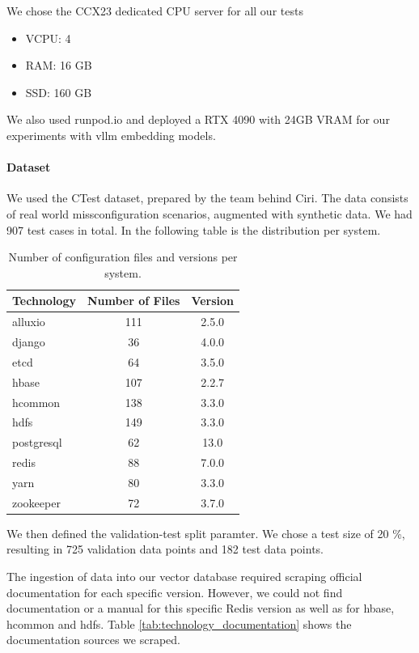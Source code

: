 We chose the CCX23 dedicated CPU server\cite{hetzner-online-gmbh-2025} for all our tests
\begin{itemize}
    \item VCPU: 4
    \item RAM: 16 GB
    \item SSD: 160 GB
\end{itemize}

We also used runpod.io\cite{runpod-2025} and deployed a RTX 4090 with 24GB VRAM for our experiments with vllm \cite{Kwon.12.09.2023} embedding models.

\paragraph{Dataset} 
We used the CTest dataset, prepared by the team behind Ciri\cite{Lian.2024}\cite{xlab-uiuc-2025}. The data consists of real world missconfiguration scenarios, augmented with synthetic data. We had 907 test cases in total. In the following table is the distribution per system.

\begin{table}[h]
    \centering
    \begin{tabular}{|l|c|c|}
        \hline
        \textbf{Technology} & \textbf{Number of Files} & \textbf{Version} \\
        \hline
        alluxio & 111 & 2.5.0 \\
        django & 36 & 4.0.0 \\
        etcd & 64 & 3.5.0 \\
        hbase & 107 & 2.2.7 \\
        hcommon & 138 & 3.3.0 \\
        hdfs & 149 & 3.3.0 \\
        postgresql & 62 & 13.0 \\
        redis & 88 & 7.0.0 \\
        yarn & 80 & 3.3.0 \\
        zookeeper & 72 & 3.7.0 \\
        \hline
    \end{tabular}
    \caption{Number of configuration files and versions per system.}
    \label{tab:technology_values}
\end{table}

We then defined the validation-test split paramter. We chose a test size of 20 \%, resulting in 725 validation data points and 182 test data points.  

The ingestion of data into our vector database required scraping official documentation for each specific version. However, we could not find documentation or a manual for this specific Redis version as well as for hbase, hcommon and hdfs. Table \ref{tab:technology_documentation} shows the documentation sources we scraped.

